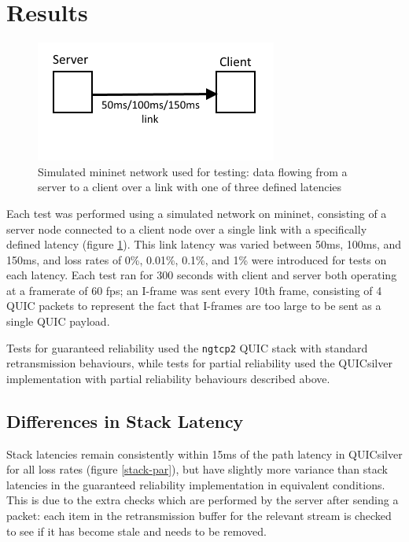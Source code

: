 \documentclass{mpaper}
\begin{document}



\section{Results}

\begin{figure}[h!]
\includegraphics[scale=0.7]{images/topology}
\centering
\caption{Simulated mininet network used for testing: data flowing from a server to a client over a link with one of three defined latencies}
\label{topology}
\end{figure}

Each test was performed using a simulated network on mininet, consisting of a server node connected to a client node over a single link with a specifically defined latency (figure \ref{topology}). This link latency was varied between 50ms, 100ms, and 150ms, and loss rates of 0\%, 0.01\%, 0.1\%, and 1\% were introduced for tests on each latency. Each test ran for 300 seconds with client and server both operating at a framerate of 60 fps; an I-frame was sent every 10th frame, consisting of 4 QUIC packets to represent the fact that I-frames are too large to be sent as a single QUIC payload.


Tests for guaranteed reliability used the \texttt{ngtcp2} QUIC stack with standard retransmission behaviours, while tests for partial reliability used the QUICsilver implementation with partial reliability behaviours described above.

\subsection{Differences in Stack Latency}

Stack latencies remain consistently within 15ms of the path latency in QUICsilver for all loss rates (figure \ref{stack-par}), but have slightly more variance than stack latencies in the guaranteed reliability implementation in equivalent conditions. This is due to the extra checks which are performed by the server after sending a packet: each item in the retransmission buffer for the relevant stream is checked to see if it has become stale and needs to be removed.
\end{document}
